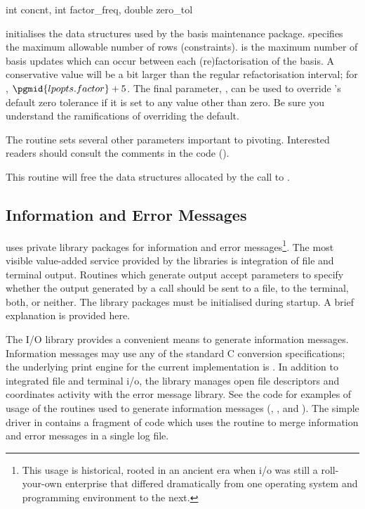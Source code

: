 \begin{subrdoc}
  \item
	  {int concnt, int factor_freq, double zero_tol}

   initialises the data structures used by the \glpk basis
  maintenance package.
   specifies the maximum allowable number of rows (constraints).
   is the maximum number of basis updates which can occur
  between each (re)factorisation of the basis.
  A conservative value will be a bit larger than the regular refactorisation
  interval; for \dylp, $\pgmid{lpopts.factor}+5$.
  The final parameter, , can be used to override \glpk's
  default zero tolerance if it is set to any value other than zero.
  Be sure you understand the ramifications of overriding the default.

  The routine sets several other parameters important to pivoting.
  Interested readers should consult the comments in the code
  ().

  \item

  This routine will free the data structures allocated by the call to
  .
\end{subrdoc}

\subsection{Information and Error Messages}
\label{sec:IOandErrorMsgs}

\dylp uses private library packages for information and error
messages\footnote{%
This usage is historical, rooted in an ancient era when i/o was still a
roll-your-own enterprise that differed dramatically from one operating system
and programming environment to the next.}.
The most visible value-added service provided by the libraries is
integration of file and terminal output.
Routines which generate output accept parameters to specify whether the
output generated by a call should be sent to a file, to the terminal, both,
or neither.
The library packages must be initialised during startup.
A brief explanation is provided here.


The I/O library provides a convenient means to generate information messages.
Information messages may use any of the standard C conversion
specifications; the
underlying print engine for the current implementation is .
In addition to integrated file and terminal i/o, the library manages open file
descriptors and coordinates activity with the error message library.
See the code for examples of usage of the routines used to generate information
messages (, , and ).
The simple driver in  contains a fragment of code which
uses the  routine to merge information and error messages in a
single log file.

